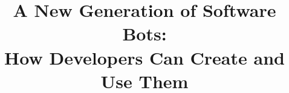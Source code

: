 \documentclass{sig-alternate}
\begin{document}
%

\title{A New Generation of Software Bots:  \\
How Developers Can Create and Use Them}

%
%
%
%
%
\end{document}
